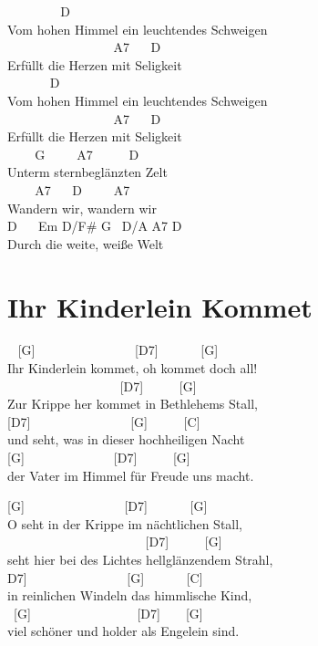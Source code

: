 \documentclass[
  letterpaper,
]{scrbook}
\begin{document}
~ ~ ~ ~ ~ D\\
Vom hohen Himmel ein leuchtendes Schweigen\\
\hspace*{0.333em} ~ ~ ~ ~ ~ ~ ~ ~ ~ ~ A7 ~ ~D\\
Erfüllt die Herzen mit Seligkeit\\
\hspace*{0.333em} ~ ~ ~ ~ D\\
Vom hohen Himmel ein leuchtendes Schweigen\\
\hspace*{0.333em} ~ ~ ~ ~ ~ ~ ~ ~ ~ ~ A7 ~ ~D\\
Erfüllt die Herzen mit Seligkeit\\
\hspace*{0.333em} ~ ~ ~G ~ ~ ~A7 ~ ~ ~ D\\
Unterm sternbeglänzten Zelt\\
\hspace*{0.333em} ~ ~ ~A7 ~ ~D ~ ~ ~A7\\
Wandern wir, wandern wir\\
D ~ ~Em D/F\# G ~D/A A7 D\\
Durch die weite, weiße Welt

\hypertarget{ihr-kinderlein-kommet}{%
\chapter{Ihr Kinderlein Kommet}\label{ihr-kinderlein-kommet}}

~ {[}G{]} ~ ~ ~ ~ ~ ~ ~ ~ ~ {[}D7{]} ~ ~ ~ ~{[}G{]} ~ ~\\
Ihr Kinderlein kommet, oh kommet doch all!\\
\hspace*{0.333em} ~ ~ ~ ~ ~ ~ ~ ~ ~ ~ ~{[}D7{]} ~ ~ ~ {[}G{]} ~ ~\\
Zur Krippe her kommet in Bethlehems Stall,\\
\hspace*{0.333em} {[}D7{]} ~ ~ ~ ~ ~ ~ ~ ~ ~ {[}G{]} ~ ~ ~ {[}C{]}\\
und seht, was in dieser hochheiligen Nacht\\
\hspace*{0.333em} {[}G{]} ~ ~ ~ ~ ~ ~ ~ ~ {[}D7{]} ~ ~ ~ {[}G{]} ~\\
der Vater im Himmel für Freude uns macht.

{[}G{]} ~ ~ ~ ~ ~ ~ ~ ~ ~ {[}D7{]} ~ ~ ~ ~{[}G{]} ~\\
O seht in der Krippe im nächtlichen Stall,\\
\hspace*{0.333em} ~ ~ ~ ~ ~ ~ ~ ~ ~ ~ ~ ~ ~ {[}D7{]} ~ ~ ~ {[}G{]} ~ ~\\
seht hier bei des Lichtes hellglänzendem Strahl,\\
\hspace*{0.333em}{[}D7{]} ~ ~ ~ ~ ~ ~ ~ ~ ~ {[}G{]} ~ ~ ~ ~{[}C{]} ~ ~
~\\
in reinlichen Windeln das himmlische Kind,\\
\hspace*{0.333em} ~{[}G{]} ~ ~ ~ ~ ~ ~ ~ ~ ~ ~{[}D7{]} ~ ~ {[}G{]}\\
viel schöner und holder als Engelein sind.
\end{document}
